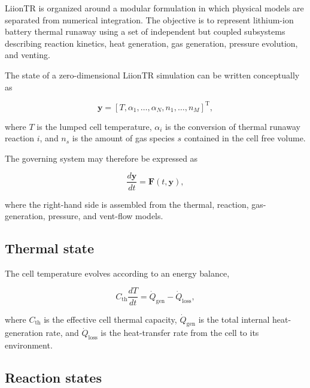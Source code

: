 LiionTR is organized around a modular formulation in which physical
models are separated from numerical integration. The objective is to
represent lithium-ion battery thermal runaway using a set of independent
but coupled subsystems describing reaction kinetics, heat generation,
gas generation, pressure evolution, and venting.

The state of a zero-dimensional LiionTR simulation can be written
conceptually as

\begin{equation}
    \mathbf{y}
    =
    \left[
        T,
        \alpha_1,
        \ldots,
        \alpha_N,
        n_1,
        \ldots,
        n_M
    \right]^{\mathrm{T}},
\end{equation}

where $T$ is the lumped cell temperature, $\alpha_i$ is the conversion
of thermal runaway reaction $i$, and $n_s$ is the amount of gas species
$s$ contained in the cell free volume.

The governing system may therefore be expressed as

\begin{equation}
    \frac{d\mathbf{y}}{dt}
    =
    \mathbf{F}
    \left(
        t,
        \mathbf{y}
    \right),
\end{equation}

where the right-hand side is assembled from the thermal, reaction,
gas-generation, pressure, and vent-flow models.


\subsection{Thermal state}

The cell temperature evolves according to an energy balance,

\begin{equation}
    C_{\mathrm{th}}
    \frac{dT}{dt}
    =
    \dot{Q}_{\mathrm{gen}}
    -
    \dot{Q}_{\mathrm{loss}},
    \label{eq:general_energy_balance}
\end{equation}

where $C_{\mathrm{th}}$ is the effective cell thermal capacity,
$\dot{Q}_{\mathrm{gen}}$ is the total internal heat-generation rate, and
$\dot{Q}_{\mathrm{loss}}$ is the heat-transfer rate from the cell to its
environment.


\subsection{Reaction states}

